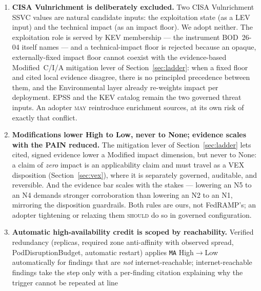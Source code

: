 \documentclass[11pt]{article}
\newcommand{\code}[1]{\texttt{#1}}
\newcommand{\rfckw}[1]{\textsc{#1}}
\begin{document}
\begin{enumerate}[leftmargin=1.7em]
  Section~\ref{sec:pain-proxy} retains consequence PAIN and permits a separately
  labeled residual-response proxy for verified local likelihood reduction. The
  same mitigation may also update the separately required IRV/LEV column; both
  outputs carry common provenance and are disclosed as correlated expressions of
  one control, not independent reductions. This reconciliation is ours, not a
  FedRAMP formula, and the proxy needs governed, disclosed calibration before
  operational use.
\item \textbf{CISA Vulnrichment is deliberately excluded.} Two CISA Vulnrichment
  SSVC values are natural candidate inputs: the exploitation state (as a
  LEV input) and the technical impact (as an impact floor). We adopt neither. The
  exploitation role is served by KEV membership --- the instrument BOD~26-04
  itself names --- and a technical-impact floor is rejected because an opaque,
  externally-fixed impact floor cannot coexist with the evidence-based
  Modified~C/I/A mitigation lever of Section~\ref{sec:ladder}: when a fixed floor
  and cited local evidence disagree, there is no principled precedence between
  them, and the Environmental layer already re-weights impact per deployment. EPSS
  and the KEV catalog remain the two governed threat inputs. An adopter \rfckw{may}
  reintroduce enrichment sources, at its own risk of exactly that conflict.
\item \textbf{Modifications lower High to Low, never to None; evidence scales with
  the PAIN reduced.} The mitigation lever of Section~\ref{sec:ladder} lets cited,
  signed evidence lower a Modified impact dimension, but never to None: a claim of
  \emph{zero} impact is an applicability claim and must travel as a VEX disposition
  (Section~\ref{sec:vex}), where it is separately governed, auditable, and
  reversible. And the evidence bar scales with the stakes --- lowering an N5 to an
  N4 demands stronger corroboration than lowering an N2 to an N1, mirroring the
  disposition guardrails. Both rules are ours, not FedRAMP's; an adopter tightening
  or relaxing them \rfckw{should} do so in governed configuration.
\item \textbf{Automatic high-availability credit is scoped by reachability.}
  Verified redundancy (replicas, required zone anti-affinity with observed spread,
  PodDisruptionBudget, automatic restart) applies \code{MA}
  High$\rightarrow$Low automatically for findings that are \emph{not}
  internet-reachable; internet-reachable findings take the step only with a
  per-finding citation explaining why the trigger cannot be repeated at line

\end{enumerate}
\end{document}
